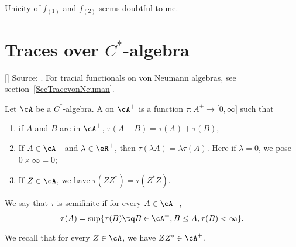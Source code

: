 \begin{probleme}
	Unicity of $f_{(1)}$ and $f_{(2)}$ seems doubtful to me.
\end{probleme}


\section{Traces over $C^*$-algebra }
\label{SecTraceCstar}

\ref{}
Source: \cite{DixmierTrace}. For tracial functionals on von Neumann algebras, see section~\ref{SecTracevonNeuman}.

\begin{definition}
    Let $\cA$ be a $C^*$-algebra. A  on $\cA^+$ is a function $\tau\colon A^+\to \mathopen[ 0 , \infty \mathclose]$ such that
    \begin{enumerate}
        \item
            if $A$ and $B$ are in $\cA^+$, $\tau(A+B)=\tau(A)+\tau(B)$,
        \item
            If $A\in\cA^+$ and $\lambda\in\eR^+$, then $\tau(\lambda A)=\lambda\tau(A)$. Here if $\lambda=0$, we pose $0\times\infty=0$;
        \item
            If $Z\in\cA$, we have $\tau(ZZ^*)=\tau(Z^*Z)$.
    \end{enumerate}
    We say that $\tau$ is semifinite if for every $A\in\cA^+$,
    \begin{equation}
        \tau(A)=\sup\{ \tau(B)\tq B\in\cA^+,B\leq A,\tau(B)<\infty \}.
    \end{equation}
\end{definition}
We recall that for every $Z\in\cA$, we have $ZZ^*\in\cA^+$.

